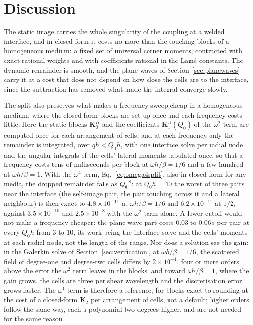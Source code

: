 \documentclass[11pt,a4paper]{article}
\newcommand{\bK}{\mathbf{K}}
\begin{document}
\FloatBarrier
\section{Discussion}\label{sec:discussion}

The static image carries the whole singularity of the coupling at a welded interface, and in closed form it
costs no more than the touching blocks of a homogeneous medium: a fixed set of universal corner moments,
contracted with exact rational weights and with coefficients rational in the Lam\'e constants. The dynamic
remainder is smooth, and the plane waves of Section~\ref{sec:planewaves} carry it at a cost that does not
depend on how close the cells are to the interface, since the subtraction has removed what made the
integral converge slowly.

The split also preserves what makes a frequency sweep cheap in a homogeneous medium, where the closed-form
blocks are set up once and each frequency costs little. Here the static blocks $\bK^{R}_0$ and the
coefficients $\bK^{R}_1(Q_0)$ of the $\omega^2$ term are computed once for each arrangement of cells, and at
each frequency only the remainder is integrated, over $qh<Q_0h$, with one interface solve per radial node
and the angular integrals of the cells' lateral moments tabulated once, so that a frequency costs tens of
milliseconds per block at $\omega h/\beta=1/6$ and a few hundred at $\omega h/\beta=1$. With the $\omega^4$ term,
Eq.~\eqref{eq:omega4split}, also in closed form for any media, the dropped remainder falls as $Q_0^{-8}$: at
$Q_0h=10$ the worst of three pairs near the interface (the self-image pair, the pair touching across it and a
lateral neighbour) is then exact to $4.8\times10^{-11}$ at $\omega h/\beta=1/6$ and $6.2\times10^{-11}$ at $1/2$,
against $3.5\times10^{-10}$ and $2.5\times10^{-8}$ with the $\omega^2$ term alone. A lower cutoff would not make a
frequency cheaper: the plane-wave part costs $0.03$ to $0.06$\,s per pair at every $Q_0h$ from $3$ to $10$, its
work being the interface solve and the cells' moments at each radial node, not the length of the range. Nor does
a solution see the gain: in the Galerkin solve of Section~\ref{sec:verification}, at $\omega h/\beta=1/6$, the
scattered field of degree-one and degree-two cells differs by $2\times10^{-4}$, four or more orders above the
error the $\omega^2$ term leaves in the blocks, and toward $\omega h/\beta=1$, where the gain grows, the cells are
three per shear wavelength and the discretisation error grows faster. The $\omega^4$ term is therefore a
reference, for blocks exact to rounding at the cost of a closed-form $\bK_2$ per arrangement of cells, not a
default; higher orders follow the same way, each a polynomial two degrees higher, and are not needed for the
same reason.
\end{document}
